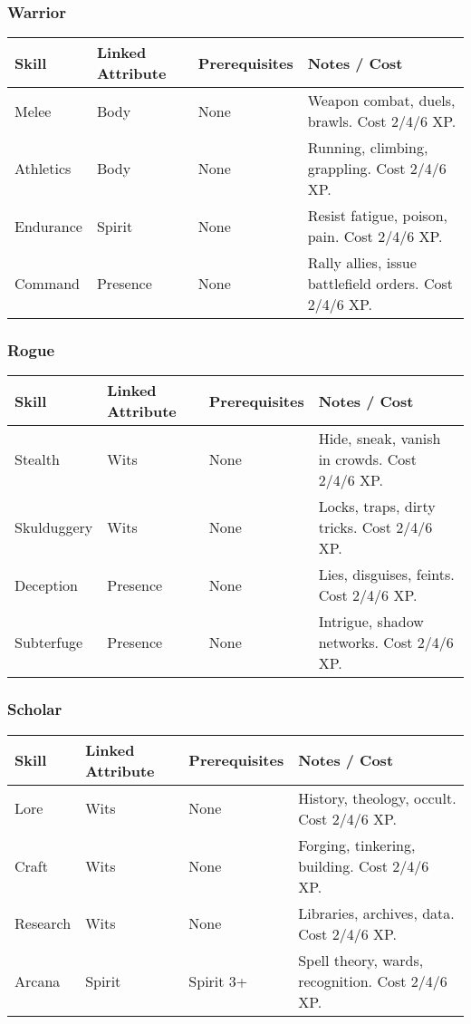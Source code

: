 \documentclass[12pt]{article}
\begin{document}
\subsubsection*{Warrior}
\begin{tabular}{@{}llll@{}}
\toprule
\textbf{Skill} & \textbf{Linked Attribute} & \textbf{Prerequisites} & \textbf{Notes / Cost} \\
\midrule
Melee & Body & None & Weapon combat, duels, brawls. Cost 2/4/6 XP. \\
Athletics & Body & None & Running, climbing, grappling. Cost 2/4/6 XP. \\
Endurance & Spirit & None & Resist fatigue, poison, pain. Cost 2/4/6 XP. \\
Command & Presence & None & Rally allies, issue battlefield orders. Cost 2/4/6 XP. \\
\bottomrule
\end{tabular}

\subsubsection*{Rogue}
\begin{tabular}{@{}llll@{}}
\toprule
\textbf{Skill} & \textbf{Linked Attribute} & \textbf{Prerequisites} & \textbf{Notes / Cost} \\
\midrule
Stealth & Wits & None & Hide, sneak, vanish in crowds. Cost 2/4/6 XP. \\
Skulduggery & Wits & None & Locks, traps, dirty tricks. Cost 2/4/6 XP. \\
Deception & Presence & None & Lies, disguises, feints. Cost 2/4/6 XP. \\
Subterfuge & Presence & None & Intrigue, shadow networks. Cost 2/4/6 XP. \\
\bottomrule
\end{tabular}

\subsubsection*{Scholar}
\begin{tabular}{@{}llll@{}}
\toprule
\textbf{Skill} & \textbf{Linked Attribute} & \textbf{Prerequisites} & \textbf{Notes / Cost} \\
\midrule
Lore & Wits & None & History, theology, occult. Cost 2/4/6 XP. \\
Craft & Wits & None & Forging, tinkering, building. Cost 2/4/6 XP. \\
Research & Wits & None & Libraries, archives, data. Cost 2/4/6 XP. \\
Arcana & Spirit & Spirit 3+ & Spell theory, wards, recognition. Cost 2/4/6 XP. \\
\bottomrule
\end{tabular}
\end{document}
